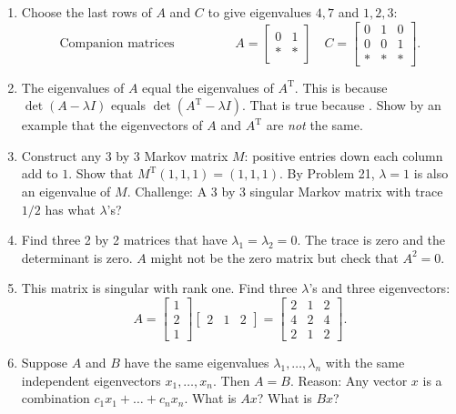 \documentclass[14pt, a4paper]{article}
\begin{document}
\begin{enumerate}
    \item Choose the last rows of $A$ and $C$ to give eigenvalues $4, 7$ and $1, 2, 3$:
          \[
              \text{Companion matrices} \hspace{2cm} A = \begin{bmatrix} 0 & 1 \\ * & * \end{bmatrix} \quad C = \begin{bmatrix} 0 & 1 & 0 \\ 0 & 0 & 1 \\ * & * & * \end{bmatrix} .
          \]

    \item The eigenvalues of $A$ equal the eigenvalues of $A^{\mathrm{T}}$. This is because $\det(A - \lambda I)$ equals $\det(A^{\mathrm{T}} - \lambda I)$. That is true because \underline{\hspace{1cm}} . Show by an example that the eigenvectors of $A$ and $A^{\mathrm{T}}$ are \textit{not} the same.

    \item Construct any 3 by 3 Markov matrix $M$: positive entries down each column add to $1$. Show that $M^{\mathrm{T}}(1, 1, 1) = (1, 1, 1)$. By Problem 21, $\lambda = 1$ is also an eigenvalue of $M$. Challenge: A 3 by 3 singular Markov matrix with trace $1/2$ has what $\lambda$'s?

    \item Find three 2 by 2 matrices that have $\lambda_1 = \lambda_2 = 0$. The trace is zero and the determinant is zero. $A$ might not be the zero matrix but check that $A^2 = 0$.

    \item This matrix is singular with rank one. Find three $\lambda$'s and three eigenvectors:
          \[
              A = \begin{bmatrix} 1 \\ 2 \\ 1 \end{bmatrix} \begin{bmatrix} 2 & 1 & 2 \end{bmatrix} = \begin{bmatrix} 2 & 1 & 2 \\ 4 & 2 & 4 \\ 2 & 1 & 2 \end{bmatrix} .
          \]

    \item Suppose $A$ and $B$ have the same eigenvalues $\lambda_1, \dots, \lambda_n$ with the same independent eigenvectors $x_1, \dots, x_n$. Then $A = B$. Reason: Any vector $x$ is a combination $c_1 x_1 + \dots + c_n x_n$. What is $Ax$? What is $Bx$?


\end{enumerate}
\end{document}
